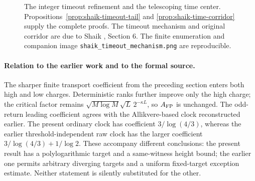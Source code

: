 \documentclass[11pt]{article}
\theoremstyle{remark}\newtheorem{remark}[proposition]{Remark}
\begin{document}
\begin{figure}[ht]
\centering
{}
\caption{The integer timeout refinement and the telescoping time center.
Propositions~\ref{prop:shaik-timeout-tail} and
\ref{prop:shaik-time-corridor} supply the complete proofs.
The timeout mechanism and original corridor are due to Shaik
\cite{Shaik2026v324}, Section 6. The finite enumeration and companion
image \texttt{shaik\_timeout\_mechanism.png} are reproducible.}
\end{figure}

\paragraph{Relation to the earlier work and to the formal source.}
The sharper finite transport coefficient from the preceding section
enters both high and low charges. Deterministic ranks further improve
only the high charge; the critical factor remains
\(\sqrt{M\log M}\sqrt L\,2^{-\kappa L}\), so \(A_{\rm FP}\) is unchanged.
The odd-return leading coefficient agrees with the Allikvere-based
clock reconstructed earlier. The present ordinary clock has coefficient
\(3/\log(4/3)\), whereas the earlier threshold-independent raw clock
has the larger coefficient \(3/\log(4/3)+1/\log2\).
These accompany different conclusions: the present result has a
polylogarithmic target and a same-witness height bound; the earlier
one permits arbitrary diverging targets and a uniform fixed-target
exception estimate. Neither statement is silently substituted for the other.
\end{document}
